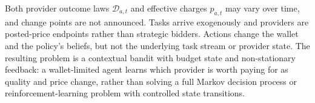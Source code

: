 Both provider outcome laws $\mathcal{D}_{a,t}$ and effective charges $p_{a,t}$ may vary over time, and change points are not announced. Tasks arrive exogenously and providers are posted-price endpoints rather than strategic bidders. Actions change the wallet and the policy's beliefs, but not the underlying task stream or provider state. The resulting problem is a contextual bandit with budget state and non-stationary feedback: a wallet-limited agent learns which provider is worth paying for as quality and price change, rather than solving a full Markov decision process or reinforcement-learning problem with controlled state transitions.
